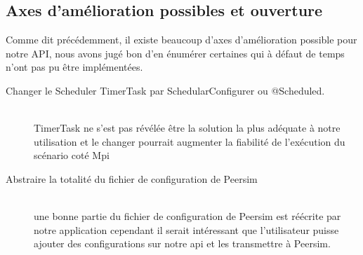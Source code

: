 \documentclass{article}
\begin{document}
			\subsection{Axes d'amélioration possibles et ouverture}
			Comme dit précédemment, il existe beaucoup d'axes d'amélioration possible pour notre API, nous avons jugé bon d'en énumérer certaines qui à défaut de temps n'ont pas pu être implémentées.

			\begin{description}
				\item[Changer le Scheduler TimerTask par SchedularConfigurer ou @Scheduled.] \hfill \\ TimerTask ne s'est pas révélée être la solution la plus adéquate à notre utilisation et le changer pourrait augmenter la fiabilité de l'exécution du scénario coté Mpi
				\item[Abstraire la totalité du fichier de configuration de Peersim] \hfill \\ une bonne partie du fichier de configuration de Peersim est réécrite par notre application cependant il serait intéressant que l'utilisateur puisse ajouter des configurations sur notre api et les transmettre à Peersim.
			  \end{description}
		

			  \newpage
\end{document}
